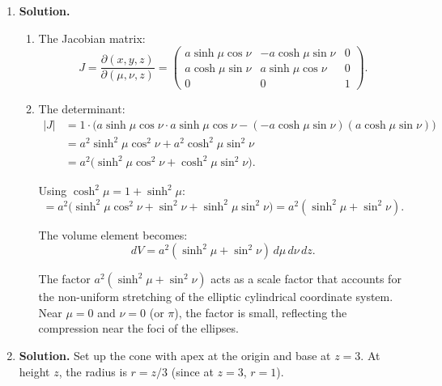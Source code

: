 \begin{enumerate}
Determinant (expanding along the first row):
\[
\frac{1}{3}\left(\frac{1}{9}+\frac{2}{9}\right)-\frac{1}{3}\left(-\frac{2}{9}+\frac{2}{9}\right)+\frac{2}{3}\left(\frac{2}{9}+\frac{1}{9}\right) = \frac{1}{3}\cdot\frac{3}{9}+0+\frac{2}{3}\cdot\frac{3}{9} = \frac{1}{9}+\frac{2}{9} = \frac{1}{3}.
\]

So $|J| = 1/3$. Also:
\[
4xyz = 4\cdot\frac{u+v+2w}{3}\cdot\frac{v+2w-2u}{3}\cdot\frac{w-u-v}{3}.
\]

The integral in $(u,v,w)$-space is:
\[
\boxed{\int_0^2\int_0^1\int_0^3 4\cdot\frac{(u+v+2w)(v+2w-2u)(w-u-v)}{27}\cdot\frac{1}{3}\,dw\,dv\,du}.
\]
\[
= \frac{4}{81}\int_0^2\int_0^1\int_0^3(u+v+2w)(v+2w-2u)(w-u-v)\,dw\,dv\,du.
\]

\item \textbf{Solution.}
\begin{enumerate}
\item The Jacobian matrix:
\[
J = \frac{\partial(x,y,z)}{\partial(\mu,\nu,z)} = \begin{pmatrix} a\sinh\mu\cos\nu & -a\cosh\mu\sin\nu & 0 \\ a\cosh\mu\sin\nu & a\sinh\mu\cos\nu & 0 \\ 0 & 0 & 1\end{pmatrix}.
\]

\item The determinant:
\begin{align*}
|J| &= 1\cdot\bigl(a\sinh\mu\cos\nu\cdot a\sinh\mu\cos\nu - (-a\cosh\mu\sin\nu)(a\cosh\mu\sin\nu)\bigr)\\
&= a^2\sinh^2\mu\cos^2\nu + a^2\cosh^2\mu\sin^2\nu \\
&= a^2\bigl(\sinh^2\mu\cos^2\nu + \cosh^2\mu\sin^2\nu\bigr).
\end{align*}

Using $\cosh^2\mu = 1+\sinh^2\mu$:
\[
= a^2\bigl(\sinh^2\mu\cos^2\nu + \sin^2\nu + \sinh^2\mu\sin^2\nu\bigr) = a^2(\sinh^2\mu + \sin^2\nu).
\]

The volume element becomes:
\[
\boxed{dV = a^2(\sinh^2\mu + \sin^2\nu)\,d\mu\,d\nu\,dz}.
\]

The factor $a^2(\sinh^2\mu+\sin^2\nu)$ acts as a scale factor that accounts for the non-uniform stretching of the elliptic cylindrical coordinate system. Near $\mu=0$ and $\nu=0$ (or $\pi$), the factor is small, reflecting the compression near the foci of the ellipses.
\end{enumerate}

\item \textbf{Solution.}
Set up the cone with apex at the origin and base at $z=3$. At height $z$, the radius is $r = z/3$ (since at $z=3$, $r=1$).


\end{enumerate}
